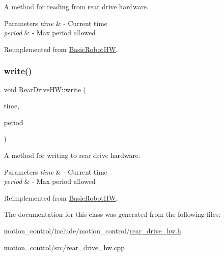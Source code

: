 A method for reading from rear drive hardware. 


\begin{DoxyParams}{Parameters}
{\em time} & -\/ Current time \\
\hline
{\em period} & -\/ Max period allowed \\
\hline
\end{DoxyParams}


Reimplemented from \hyperlink{classBasicRobotHW_a4246adb060fa49a3eb9d5d26845b6425}{Basic\+Robot\+HW}.

\mbox{\label{classRearDriveHW_a36461317b3f595464ef080259bc21fae}} 
\subsubsection{\texorpdfstring{write()}{write()}}
{\footnotesize\ttfamily void Rear\+Drive\+H\+W\+::write (\begin{DoxyParamCaption}\item[{const ros\+::\+Time \&}]{time,  }\item[{const ros\+::\+Duration \&}]{period }\end{DoxyParamCaption})\hspace{0.3cm}{\ttfamily [virtual]}}



A method for writing to rear drive hardware. 


\begin{DoxyParams}{Parameters}
{\em time} & -\/ Current time \\
\hline
{\em period} & -\/ Max period allowed \\
\hline
\end{DoxyParams}


Reimplemented from \hyperlink{classBasicRobotHW_a62add5eabfca2f88a5035db8b8240bb3}{Basic\+Robot\+HW}.



The documentation for this class was generated from the following files\+:\begin{DoxyCompactItemize}
\item 
motion\+\_\+control/include/motion\+\_\+control/\hyperlink{rear__drive__hw_8h}{rear\+\_\+drive\+\_\+hw.\+h}\item 
motion\+\_\+control/src/rear\+\_\+drive\+\_\+hw.\+cpp\end{DoxyCompactItemize}
